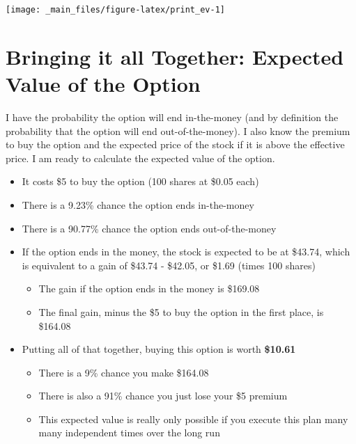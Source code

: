 \documentclass[
]{book}
\providecommand{\tightlist}{%
  \setlength{\itemsep}{0pt}\setlength{\parskip}{0pt}}
\begin{document}
\begin{center}\texttt{[image: \_main\_files/figure-latex/print\_ev-1]} \end{center}

\hypertarget{bringing-it-all-together-expected-value-of-the-option}{%
\section{Bringing it all Together: Expected Value of the Option}\label{bringing-it-all-together-expected-value-of-the-option}}

I have the probability the option will end in-the-money (and by definition the
probability that the option will end out-of-the-money). I also know the premium
to buy the option and the expected price of the stock if it is above the
effective price. I am ready to calculate the expected value of the option.

\begin{itemize}
\tightlist
\item
  It costs \$5 to buy the option (100 shares at \$0.05 each)
\item
  There is a 9.23\% chance
  the option ends in-the-money
\item
  There is a 90.77\% chance the option ends
  out-of-the-money
\item
  If the option ends in the money, the stock is expected to be at
  \$43.74, which is equivalent to a gain of \$43.74 -
  \$42.05, or \$1.69 (times 100 shares)

  \begin{itemize}
  \tightlist
  \item
    The gain if the option ends in the money is \$169.08
  \item
    The final gain, minus the \$5 to buy the option in the first place, is
    \$164.08
  \end{itemize}
\item
  Putting all of that together, buying this option is worth
  \textbf{\$10.61}

  \begin{itemize}
  \tightlist
  \item
    There is a 9\% chance you make \$164.08
  \item
    There is also a 91\% chance you just lose your \$5 premium
  \item
    This expected value is really only possible if you execute this plan
    many many independent times over the long run
  \end{itemize}
\end{itemize}
\end{document}
